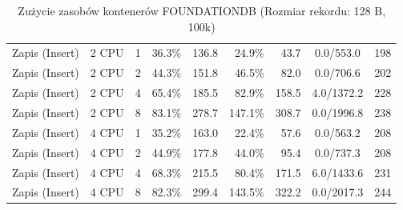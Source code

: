 \begin{table}[ht]
{\begin{tabular}{llcrrrrcc}
Zapis (Insert) & 2 CPU & 1 & 36.3\% & 136.8 & 24.9\% & 43.7 & 0.0/553.0 & 198 \\
Zapis (Insert) & 2 CPU & 2 & 44.3\% & 151.8 & 46.5\% & 82.0 & 0.0/706.6 & 202 \\
Zapis (Insert) & 2 CPU & 4 & 65.4\% & 185.5 & 82.9\% & 158.5 & 4.0/1372.2 & 228 \\
Zapis (Insert) & 2 CPU & 8 & 83.1\% & 278.7 & 147.1\% & 308.7 & 0.0/1996.8 & 238 \\
Zapis (Insert) & 4 CPU & 1 & 35.2\% & 163.0 & 22.4\% & 57.6 & 0.0/563.2 & 208 \\
Zapis (Insert) & 4 CPU & 2 & 44.9\% & 177.8 & 44.0\% & 95.4 & 0.0/737.3 & 208 \\
Zapis (Insert) & 4 CPU & 4 & 68.3\% & 215.5 & 80.4\% & 171.5 & 6.0/1433.6 & 231 \\
Zapis (Insert) & 4 CPU & 8 & 82.3\% & 299.4 & 143.5\% & 322.2 & 0.0/2017.3 & 244 \\
\bottomrule
\end{tabular}%
}
\caption{Zużycie zasobów kontenerów FOUNDATIONDB (Rozmiar rekordu: 128 B, 100k)}
\label{tab:resources_foundationdb_small_100000}
\end{table}
